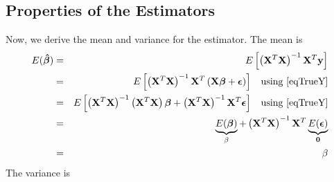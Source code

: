 \documentclass[11pt]{article}
\theoremstyle{remark}
\begin{document}
\subsection{Properties of the Estimators}
Now, we derive the mean and variance for the estimator. The mean is
\begin{eqnarray}
E(\boldsymbol{\hat{\beta}}) &=& E\left[  \left(\bold{X}^T\bold{X}\right)^{-1}\bold{X}^T\bold{y} \right]\nonumber\\
&=& E\left[  \left(\bold{X}^T\bold{X}\right)^{-1}\bold{X}^T\left(\bold{X}\boldsymbol{\beta} + \boldsymbol{\epsilon}\right) \right]\:\:\:\:\text{using \eqref{eqTrueY}}\nonumber\\
&=& E\left[  \left(\bold{X}^T\bold{X}\right)^{-1}\left(\bold{X}^T\bold{X}\right)\boldsymbol{\beta} + \left(\bold{X}^T\bold{X}\right)^{-1}\bold{X}^T\boldsymbol{\epsilon} \right]\:\:\:\:\text{using \eqref{eqTrueY}}\nonumber\\
&=& \underbrace{E(\boldsymbol{\beta})}_{\beta}+ \left(\bold{X}^T\bold{X}\right)^{-1}\bold{X}^T\underbrace{E(\boldsymbol{\epsilon})}_{\bold{0}}\nonumber\\
&=& \beta \label{MeanEstimatorBeta}
\end{eqnarray}
The variance is
\end{document}
